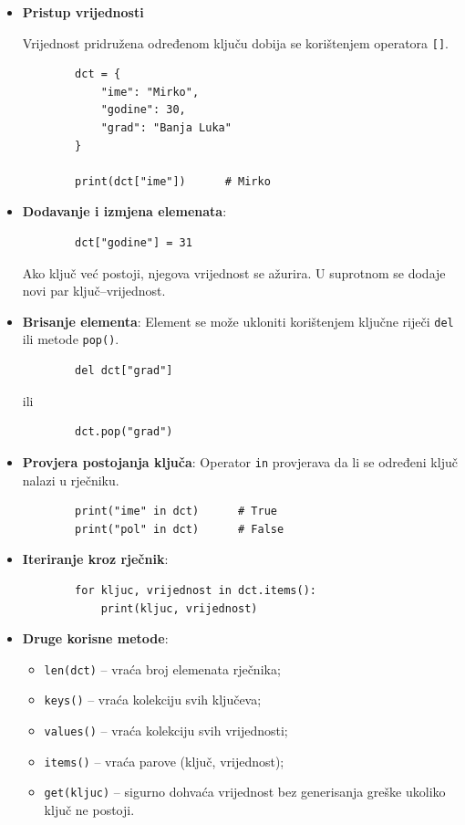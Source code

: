 \begin{itemize}
	
	\item \textbf{Pristup vrijednosti}
	
	Vrijednost pridružena određenom ključu dobija se korištenjem operatora \texttt{[]}.
	
	\begin{verbatim}
		dct = {
			"ime": "Mirko",
			"godine": 30,
			"grad": "Banja Luka"
		}
		
		print(dct["ime"])      # Mirko
	\end{verbatim}
	
	\item \textbf{Dodavanje i izmjena elemenata}: 
	\begin{verbatim}
		dct["godine"] = 31
	\end{verbatim}
	
	Ako ključ već postoji, njegova vrijednost se ažurira. U suprotnom se dodaje novi par ključ--vrijednost.
	
	\item \textbf{Brisanje elementa}: Element se može ukloniti korištenjem ključne riječi \texttt{del} ili metode \texttt{pop()}.
	
	\begin{verbatim}
		del dct["grad"]
	\end{verbatim}
	
	ili
	
	\begin{verbatim}
		dct.pop("grad")
	\end{verbatim}
	
	\item \textbf{Provjera postojanja ključa}:   Operator \texttt{in} provjerava da li se određeni ključ nalazi u rječniku.
	
	\begin{verbatim}
		print("ime" in dct)      # True
		print("pol" in dct)      # False
	\end{verbatim}
	
	\item \textbf{Iteriranje kroz rječnik}:
	
	\begin{verbatim}
		for kljuc, vrijednost in dct.items():
		    print(kljuc, vrijednost)
	\end{verbatim}
	
	\item \textbf{Druge korisne metode}: 
	
	\begin{itemize}
		\item \texttt{len(dct)} -- vraća broj elemenata rječnika;
		\item \texttt{keys()} -- vraća kolekciju svih ključeva;
		\item \texttt{values()} -- vraća kolekciju svih vrijednosti;
		\item \texttt{items()} -- vraća parove (ključ, vrijednost);
		\item \texttt{get(kljuc)} -- sigurno dohvaća vrijednost bez generisanja greške ukoliko ključ ne postoji.
	\end{itemize}
	
\end{itemize}

